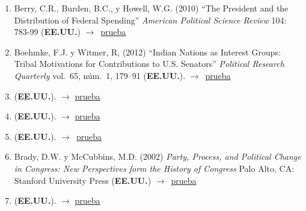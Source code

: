 \documentclass[12 pt, letter]{article}
\newenvironment{CitasMiTrabajo}{
    \begin{footnotesize}
    \begin{enumerate}[label={\footnotesize\emph{cita~\arabic*}},ref=\arabic*] %
        \setlength{\itemsep}{.1\itemsep}
        \setlength{\parskip}{.1\parskip}
    }{\end{enumerate}\end{footnotesize}}
\begin{document}
\begin{CitasMiTrabajo}
       \item Berry, C.R., Burden, B.C., y Howell, W.G. (2010) ``The President and the Distribution of Federal Spending'' \emph{American Political Science Review} 104: 783-99 (\textbf{EE.UU.}) $\rightarrow$~\href{https://github.com/emagar/cv/blob/master/citasMiTrab/coxMagar/berryetal2010apsr.pdf}{prueba}

        \item Boehmke, F.J. y  Witmer, R, (2012) ``Indian Nations as Interest Groups: Tribal Motivations for Contributions to U.S. Senators'' \emph{Political Research Quarterly} vol.~65, n\'um.~1, 179--91  (\textbf{EE.UU.}). $\rightarrow$~\href{https://github.com/emagar/cv/blob/master/citasMiTrab/coxMagar/boehmkeSenateContrib2012prq.pdf}{prueba}

       \item {} (\textbf{EE.UU.}).  $\rightarrow$ \href{https://pdfs.semanticscholar.org/1c83/f46c4a755e8fc42af095e5e8ee49d12c7152.pdf}{prueba}
         
        \item {} (\textbf{EE.UU.}). $\rightarrow$ \href{https://github.com/emagar/cv/blob/master/citasMiTrab/coxMagar/bonicaIdeolMarketplace2013ajps.pdf}{prueba}

       \item {} (\textbf{EE.UU.}).  $\rightarrow$~\href{http://web.stanford.edu/~bonica/papers/bonica_ajps_mimp_2014.pdf}{prueba}
          
        \item Brady, D.W. y McCubbins, M.D. (2002)
        \emph{Party, Process, and Political Change in Congress: New Perspectives form the History of
        Congress} Palo Alto, CA: Stanford University Press  (\textbf{EE.UU.}) $\rightarrow$~\href{https://github.com/emagar/cv/blob/master/citasMiTrab/coxMagar/brady.pdf}{prueba}

       \item {} (\textbf{EE.UU.}).  $\rightarrow$ \href{https://www.semanticscholar.org/paper/The-Role-of-Party%3A-The-Legislative-Consequences-of-Carroll-Eichorst/860d28cf751505f957390eec17b27653b9c4d9da?tab=abstract&citingPapersSort=is-influential&citingPapersLimit=10&citingPapersOffset=0&year%5B0%5D=&year%5B1%5D=&citedPapersSort=year&citedPapersLimit=10&citedPapersOffset=20}{prueba}


\end{CitasMiTrabajo}
\end{document}
